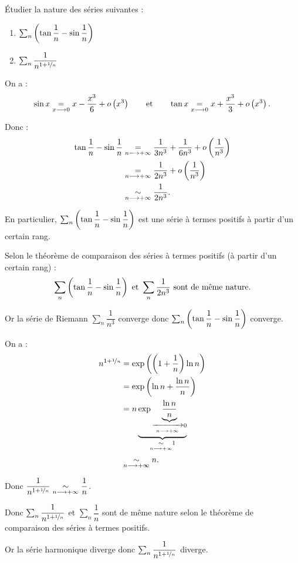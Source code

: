\begin{exoex}
Étudier la nature des séries suivantes :

\begin{enumerate}
    \item \(\sum_n\left(\tan\dfrac{1}{n}-\sin\dfrac{1}{n}\right)\) \\
    \item \(\sum_n\dfrac{1}{n^{1+\nicefrac{1}{n}}}\)
\end{enumerate}
\end{exoex}

\begin{corr}[1]
On a : \[\sin x\underset{x\longrightarrow0}{=}x-\dfrac{x^3}{6}+o\left(x^3\right)\qquad\text{et}\qquad\tan x\underset{x\longrightarrow0}{=}x+\dfrac{x^3}{3}+o\left(x^3\right).\]

Donc : \[\begin{aligned}
\tan\dfrac{1}{n}-\sin\dfrac{1}{n}&\underset{n\longrightarrow+\infty}{=}\dfrac{1}{3n^3}+\dfrac{1}{6n^3}+o\left(\dfrac{1}{n^3}\right) \\
&\underset{n\longrightarrow+\infty}{=}\dfrac{1}{2n^3}+o\left(\dfrac{1}{n^3}\right) \\
&\underset{n\longrightarrow+\infty}{\sim}\dfrac{1}{2n^3}.
\end{aligned}\]

En particulier, \(\sum_n\left(\tan\dfrac{1}{n}-\sin\dfrac{1}{n}\right)\) est une série à termes positifs à partir d'un certain rang.

Selon le théorème de comparaison des séries à termes positifs (à partir d'un certain rang) : \[\sum_n\left(\tan\dfrac{1}{n}-\sin\dfrac{1}{n}\right)\text{ et }\sum_n\dfrac{1}{2n^3}\text{ sont de même nature}.\]

Or la série de Riemann \(\sum_n\dfrac{1}{n^3}\) converge donc \(\sum_n\left(\tan\dfrac{1}{n}-\sin\dfrac{1}{n}\right)\) converge.
\end{corr}

\begin{corr}[2]
On a : \[\begin{aligned}
n^{1+\nicefrac{1}{n}}&=\exp\left(\left(1+\dfrac{1}{n}\right)\ln n\right) \\
&=\exp\left(\ln n+\dfrac{\ln n}{n}\right) \\
&=n\underbrace{\exp\underbrace{\dfrac{\ln n}{n}}_{\xrightarrow[n\longrightarrow+\infty]{}0}}_{\underset{n\longrightarrow+\infty}{\sim}1} \\
&\underset{n\longrightarrow+\infty}{\sim}n.
\end{aligned}\]

Donc \(\dfrac{1}{n^{1+\nicefrac{1}{n}}}\underset{n\longrightarrow+\infty}{\sim}\dfrac{1}{n}\).

Donc \(\sum_n\dfrac{1}{n^{1+\nicefrac{1}{n}}}\) et \(\sum_n\dfrac{1}{n}\) sont de même nature selon le théorème de comparaison des séries à termes positifs.

Or la série harmonique diverge donc \(\sum_n\dfrac{1}{n^{1+\nicefrac{1}{n}}}\) diverge.
\end{corr}

